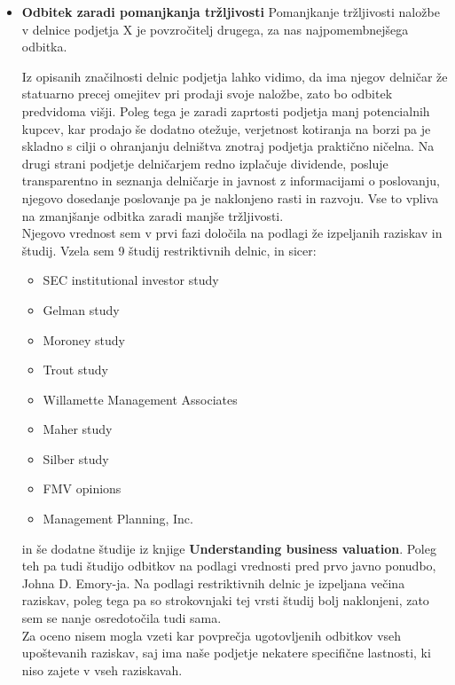 \documentclass[12pt,a4paper]{amsart}
\theoremstyle{definition} %
\theoremstyle{plain} %
\begin{document}
\begin{itemize}
\item{\textbf{Odbitek zaradi pomanjkanja tržljivosti}}
Pomanjkanje tržljivosti naložbe v delnice podjetja X je povzročitelj drugega, za nas najpomembnejšega odbitka.\par
Iz opisanih značilnosti delnic podjetja lahko vidimo, da ima njegov delničar že statuarno precej omejitev pri prodaji svoje naložbe, zato bo odbitek predvidoma višji. Poleg tega je zaradi zaprtosti podjetja manj potencialnih kupcev, kar prodajo še dodatno otežuje, verjetnost kotiranja na borzi pa je skladno s cilji o ohranjanju delništva znotraj podjetja praktično ničelna. Na drugi strani podjetje delničarjem redno izplačuje dividende, posluje transparentno in seznanja delničarje in javnost z informacijami o poslovanju, njegovo dosedanje poslovanje pa je naklonjeno rasti in razvoju. Vse to vpliva na zmanjšanje odbitka zaradi manjše tržljivosti.\\
Njegovo vrednost sem v prvi fazi določila na podlagi že izpeljanih raziskav in študij. Vzela sem 9 študij restriktivnih delnic, in sicer:
\begin{itemize}
\item SEC institutional investor study
\item Gelman study
\item Moroney study
\item Trout study
\item Willamette Management Associates
\item Maher study
\item Silber study
\item FMV opinions
\item Management Planning, Inc.
\end{itemize}
in še dodatne študije iz knjige \textbf{Understanding business valuation}.
Poleg teh pa tudi študijo odbitkov na podlagi vrednosti pred prvo javno ponudbo, Johna D. Emory-ja. Na podlagi restriktivnih delnic je izpeljana večina raziskav, poleg tega pa so strokovnjaki tej vrsti študij bolj naklonjeni, zato sem se nanje osredotočila tudi sama.\\
Za oceno nisem mogla vzeti kar povprečja ugotovljenih odbitkov vseh upoštevanih raziskav, saj ima naše podjetje nekatere specifične lastnosti, ki niso zajete v vseh raziskavah.\par 

\end{itemize}
\end{document}
